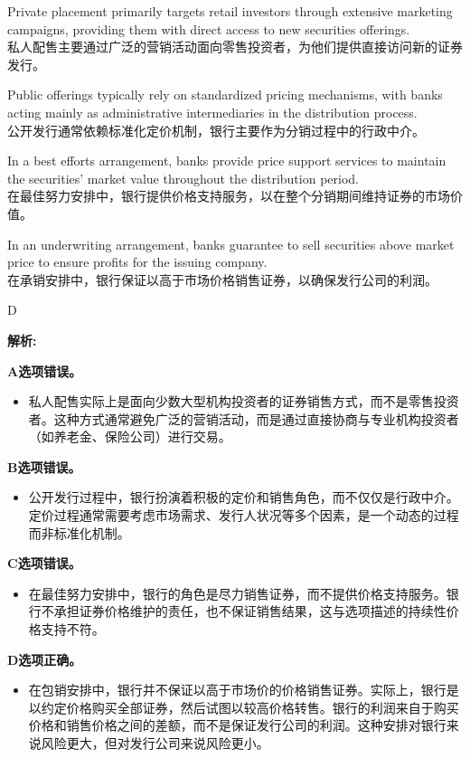 \documentclass{article}
\newenvironment{explanation}
{\textbf{解析:}\par}
{\par}
\begin{document}
\begin{choices}
    \item Private placement primarily targets retail investors through extensive marketing campaigns, providing them with direct access to new securities offerings.\\
    私人配售主要通过广泛的营销活动面向零售投资者，为他们提供直接访问新的证券发行。
    \item Public offerings typically rely on standardized pricing mechanisms, with banks acting mainly as administrative intermediaries in the distribution process.\\
    公开发行通常依赖标准化定价机制，银行主要作为分销过程中的行政中介。
    \item In a best efforts arrangement, banks provide price support services to maintain the securities' market value throughout the distribution period.\\
    在最佳努力安排中，银行提供价格支持服务，以在整个分销期间维持证券的市场价值。
    \item In an underwriting arrangement, banks guarantee to sell securities above market price to ensure profits for the issuing company.\\
    在承销安排中，银行保证以高于市场价格销售证券，以确保发行公司的利润。
\end{choices}

\begin{correctanswer}
    D
\end{correctanswer}

\begin{explanation}
    \textbf{A选项错误。}
    \begin{itemize}
        \item 私人配售实际上是面向少数大型机构投资者的证券销售方式，而不是零售投资者。这种方式通常避免广泛的营销活动，而是通过直接协商与专业机构投资者（如养老金、保险公司）进行交易。
    \end{itemize}

    \textbf{B选项错误。}
    \begin{itemize}
        \item 公开发行过程中，银行扮演着积极的定价和销售角色，而不仅仅是行政中介。定价过程通常需要考虑市场需求、发行人状况等多个因素，是一个动态的过程而非标准化机制。
    \end{itemize}

    \textbf{C选项错误。}
    \begin{itemize}
        \item 在最佳努力安排中，银行的角色是尽力销售证券，而不提供价格支持服务。银行不承担证券价格维护的责任，也不保证销售结果，这与选项描述的持续性价格支持不符。
    \end{itemize}

    \textbf{D选项正确。}
    \begin{itemize}
        \item 在包销安排中，银行并不保证以高于市场价的价格销售证券。实际上，银行是以约定价格购买全部证券，然后试图以较高价格转售。银行的利润来自于购买价格和销售价格之间的差额，而不是保证发行公司的利润。这种安排对银行来说风险更大，但对发行公司来说风险更小。
    \end{itemize}
\end{explanation}
\end{document}
